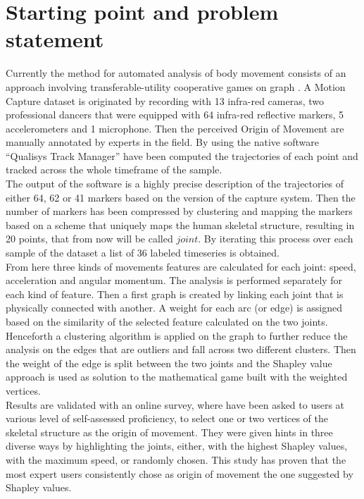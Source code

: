 \section{Starting point and problem statement}
Currently the method for automated analysis of body movement consists of an approach involving transferable-utility cooperative games on graph \cite{kolykhalova:2020}.
A Motion Capture dataset is originated by recording with 13 infra-red cameras, two professional dancers that were equipped with 64 infra-red reflective markers, 5 accelerometers and 1 microphone.
Then the perceived Origin of Movement are manually annotated by experts in the field.
By using the native software “Qualisys Track Manager” have been computed the trajectories of each point and tracked across the whole timeframe of the sample.\\
The output of the software is a highly precise description of the trajectories of either 64, 62 or 41 markers based on the version of the capture system. 
Then the number of markers has been compressed by clustering and mapping the markers based on a scheme that uniquely maps the human skeletal structure, resulting in 20 points, that from now will be called $joint$.
By iterating this process over each sample of the dataset a list of 36 labeled timeseries is obtained.\\
From here three kinds of movements features are calculated for each joint: speed, acceleration and angular momentum.
The analysis is performed separately for each kind of feature.
Then a first graph is created by linking each joint that is physically connected with another.
A weight for each arc (or edge) is assigned based on the similarity of the selected feature calculated on the two joints.
Henceforth a clustering algorithm is applied on the graph to further reduce the analysis on the edges that are outliers and fall across two different clusters.
Then the weight of the edge is split between the two joints and the Shapley value approach is used as solution to the mathematical game built with the weighted vertices.\\

Results are validated with an online survey, where have been asked to users at various level of self-assessed proficiency, 
to select one or two vertices of the skeletal structure as the origin of movement.
They were given hints in three diverse ways by highlighting the joints, either, 
with the highest Shapley values, with the maximum speed, or randomly chosen. 
This study has proven that the most expert users consistently chose as origin of movement the one suggested by Shapley values. 



